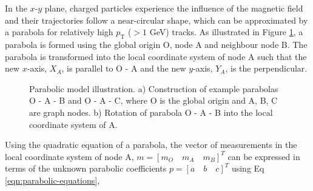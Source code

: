 In the $x$-$y$ plane, charged particles experience the influence of the magnetic field and their trajectories follow a near-circular shape, which can be approximated by a parabola for relatively high $p_{\text{T}}$ ($> 1$ GeV) tracks. As illustrated in Figure \ref{fig:gnn-parabolic-model}, a parabola is formed using the global origin O, node A and neighbour node B. The parabola is transformed into the local coordinate system of node A such that the new $x$-axis, $X_A$, is parallel to O - A and the new $y$-axis, $Y_A$, is the perpendicular. 

\begin{figure}[htbp!] 
    \centering
    \hfill%
    \caption{Parabolic model illustration. a) Construction of example parabolas O - A - B and O - A - C, where O is the global origin and A, B, C are graph nodes. b) Rotation of parabola O - A - B into the local coordinate system of A.}
    \label{fig:gnn-parabolic-model}
\end{figure}


Using the quadratic equation of a parabola, the vector of measurements in the local coordinate system of node A, $ m = [m_O \quad m_A \quad m_B]^{T}$ can be expressed in terms of the unknown parabolic coefficients $p = [a \quad b \quad c]^{T}$ using Eq \eqref{eqn:parabolic-equations}, 

